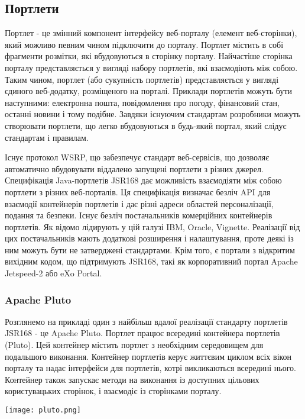 \subsection{Портлети}
Портлет - це змінний компонент інтерфейсу веб-порталу (елемент веб-сторінки), який можливо певним чином підключити до порталу.
Портлет містить в собі фрагменти розмітки, які вбудовуються в сторінку порталу. 
Найчастіше сторінка порталу представляється у вигляді набору портлетів, які взаємодіють між собою. 
Таким чином, портлет (або сукупність портлетів) представляється у вигляді єдиного веб-додатку, розміщеного на порталі. 
Приклади портлетів можуть бути наступними: електронна пошта, повідомлення про погоду, фінансовий стан, останні новини і тому подібне.
Завдяки існуючим стандартам розробники можуть створювати портлети, що легко вбудовуються в будь-який портал, який слідує стандартам і правилам.
\par Існує протокол WSRP, що забезпечує стандарт веб-сервісів, що дозволяє автоматично вбудовувати віддалено запущені портлети з різних джерел.
Специфікація Java-портлетів JSR168 дає можливість взаємодіяти між собою портлети з різних веб-порталів. 
Ця специфікація визначає безліч API для взаємодії контейнерів портлетів і дає різні адреси областей персоналізації, подання та безпеки.
Існує безліч постачальників комерційних контейнерів портлетів. 
Як відомо лідирують у цій галузі IBM, Oracle, Vignette. 
Реалізації від цих постачальників мають додаткові розширення і налаштування, проте деякі із ним можуть бути не затверджені стандартами. 
Крім того, є портали з відкритим вихідним кодом, що підтримують JSR168, такі як корпоративний портал Apache Jetspeed-2 або eXo Portal.
\subsubsection{Apache Pluto}
Розглянемо на прикладі один з найбільш вдалої реалізації стандарту портлетів JSR168 - це Apache Pluto.
Портлет працює всередині контейнера портлетів (Pluto).
Цей контейнер містить портлет з необхідним середовищем для подальшого виконання.
Контейнер портлетів керує життєвим циклом всіх вікон порталу та надає інтерфейси для портлетів, котрі викликаються всередині нього.
Контейнер також запускає методи на виконання із доступних цільових користувацьких сторінок, і взаємодіє із сторінками порталу.

        \begin{center}
		\texttt{[image: pluto.png]}
	\end{center}

